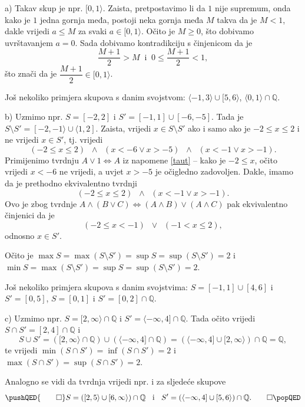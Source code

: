 \begin{proof*}
a) Takav skup je npr. $[0, 1\rangle$. Zaista, pretpostavimo li da \(1\) nije supremum, onda kako je $1$ jedna gornja međa, postoji neka gornja međa \(M\) takva da je \(M<1\), dakle vrijedi \(a\leq M\) za svaki \(a\in [0, 1\rangle\). Očito je \(M\geq 0\), što dobivamo uvrštavanjem $a=0$. Sada dobivamo kontradikciju s činjenicom da je \[\dfrac{M+1}{2}>M\;\;\text{i}\;\;0\leq \dfrac{M+1}{2}<1,\] što znači da je \(\dfrac{M+1}{2}\in [0, 1\rangle\).

Još nekoliko primjera skupova s danim svojstvom: $\langle -1, 3\rangle\cup [5, 6\rangle$, $\langle 0, 1\rangle\cap \mathbb{Q}$.

b) Uzmimo npr. $S=[-2, 2]$ i $S'=[-1, 1]\cup [-6, -5]$. Tada je $S\setminus S'=[-2, -1\rangle \cup \langle 1, 2]$. Zaista, vrijedi $x\in S\setminus S'$ ako i samo ako je $-2\leq x\leq 2$ i ne vrijedi $x\in S'$, tj. vrijedi
$$\left(-2\leq x\leq 2\right)\;\;\wedge\;\;\left(x<-6\vee x>-5\right)\;\;\wedge\;\;\left(x<-1\vee x>-1\right).$$
Primijenimo tvrdnju $A\vee 1\Leftrightarrow A$ iz napomene \ref{taut} -- kako je $-2\leq x$, očito vrijedi $x<-6$ ne vrijedi, a uvjet $x>-5$ je očigledno zadovoljen. Dakle, imamo da je prethodno ekvivalentno tvrdnji 
$$\left(-2\leq x\leq 2\right)\;\;\wedge\;\;\left(x<-1\vee x>-1\right).$$
Ovo je zbog tvrdnje $A\wedge (B\vee C)\Leftrightarrow (A\wedge B)\vee (A\wedge C)$ pak ekvivalentno činjenici da je $$\left(-2\leq x<-1\right)\;\; \vee \;\;\left(-1<x\leq 2\right),$$
odnosno $x\in S'$.

Očito je $\max{S}=\max{\left(S\setminus S'\right)}=\sup{S}=\sup{\left(S\setminus S'\right)}=2$ i $\min{S}=\max{\left(S\setminus S'\right)}=\sup{S}=\sup{\left(S\setminus S'\right)}=2$.

Još nekoliko primjera skupova s danim svojstvima: $S=[-1, 1]\cup [4, 6]$ i $S'=[0, 5]$, $S=[0, 1]$ i $S'=[0, 2]\cap \mathbb{Q}$.

c) Uzmimo npr. $S=[2, \infty\rangle \cap \mathbb{Q}$ i $S'=\langle -\infty, 4]\cap \mathbb{Q}$. Tada očito vrijedi $S\cap S'=[2, 4]\cap \mathbb{Q}$ i $$S\cup S'=\left([2, \infty\rangle \cap \mathbb{Q}\right)\cup\left(\langle -\infty, 4]\cap \mathbb{Q}\right)=\left(\langle -\infty, 4]\cup [2, \infty\rangle\right)\cap \mathbb{Q}=\mathbb{Q},$$
te vrijedi $\min{\left(S\cap S'\right)}=\inf{\left(S\cap S'\right)}=2$ i $\max{\left(S\cap S'\right)}=\sup{\left(S\cap S'\right)}=2$.

Analogno se vidi da tvrdnja vrijedi npr. i za sljedeće skupove
\[\pushQED{\qed}
S=\left([2, 5\rangle \cup [6, \infty\rangle\right) \cap \mathbb{Q}\;\;\text{ i }\;\; S'=\left(\langle -\infty, 4]\cup [5, 6\rangle\right)\cap \mathbb{Q}.\qedhere
\popQED
\]
\end{proof*}
